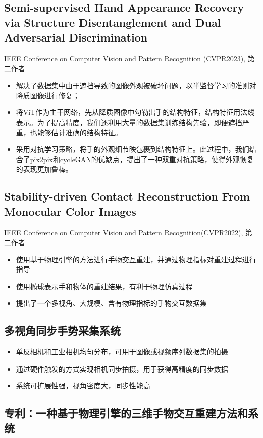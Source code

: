 \documentclass{resume}
\begin{document}
\subsection{\textbf{Semi-supervised Hand Appearance Recovery via Structure Disentanglement and Dual Adversarial Discrimination}}
IEEE Conference on Computer Vision and Pattern Recognition (CVPR2023), 第二作者
\begin{itemize}
  \item 解决了数据集中由于遮挡导致的图像外观被破坏问题，以半监督学习的准则对降质图像进行修复；
  \item 将ViT作为主干网络，先从降质图像中勾勒出手的结构特征，结构特征用法线表示。为了提高精度，我们还利用大量的数据集训练结构先验，即便遮挡严重，也能够估计准确的结构特征。
  \item 采用对抗学习策略，将手的外观细节映包裹到结构特征上。此过程中，我们结合了pix2pix和cycleGAN的优缺点，提出了一种双重对抗策略，使得外观恢复的表现更加鲁棒。
\end{itemize}

\subsection{\textbf{Stability-driven Contact Reconstruction From Monocular Color Images}}
IEEE Conference on Computer Vision and Pattern Recognition(CVPR2022),  第二作者

\begin{itemize}
  \item 使用基于物理引擎的方法进行手物交互重建，并通过物理指标对重建过程进行指导
  \item 使用椭球表示手和物体的重建结果，有利于物理仿真过程
  \item 提出了一个多视角、大规模、含有物理指标的手物交互数据集
\end{itemize}

\subsection{\textbf{多视角同步手势采集系统}}
\begin{itemize}
  \item 单反相机和工业相机均匀分布，可用于图像或视频序列数据集的拍摄
  \item 通过硬件触发的方式实现相机同步拍摄，用于获得高精度的同步数据
  \item 系统可扩展性强，视角密度大，同步性能高
\end{itemize}

\subsection{\textbf{专利：一种基于物理引擎的三维手物交互重建方法和系统}}
\vspace{2mm}
\end{document}
